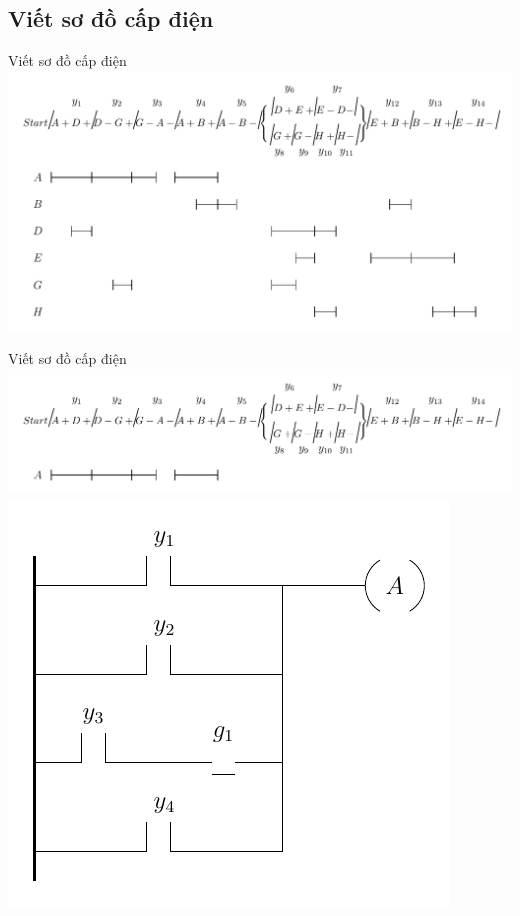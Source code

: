 \documentclass[24pt]{beamer}
\begin{document}
\subsection*{Viết sơ đồ cấp điện}
\begin{frame}[plain]{Viết sơ đồ cấp điện}
		\vspace{-0.5cm}
		\hspace{-1cm}\includegraphics[scale=0.7]{draw-tikz/quatrinh-bt4-buoc3-danhdau.pdf}
\end{frame}

\begin{frame}[plain]{Viết sơ đồ cấp điện}
		\vspace{-0.5cm}
		\hspace{-1cm}\includegraphics[scale=0.7]{draw-tikz/quatrinh-bt4-buoc3-sodocapdien-A-b1.pdf}\\
		\vspace{-.5cm}
		\includegraphics[scale=0.8]{draw-tikz/quatrinh-bt4-buoc3-sodocapdien-A-b2.pdf}
\end{frame}
\end{document}
